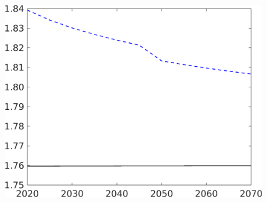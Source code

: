 \begin{figure}[h!!]
\begin{minipage}[]{0.32\textwidth}
\end{minipage}
\begin{minipage}[]{0.32\textwidth}
	\includegraphics[width=1\textwidth]{../../codding_model/own_basedOnFried/optimalPol_190722_tidiedUp/figures/all_10Aout22/CountTaul_modtest_target_whwl_spillover0_sep1_extern0_PV1_etaa0.79_lgd0.png}
\end{minipage}
\end{figure} 

